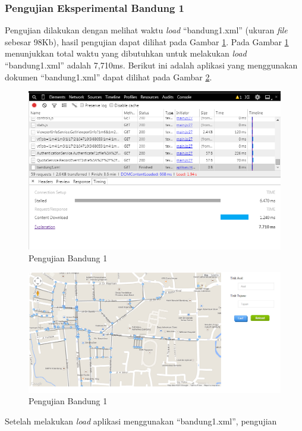 \subsubsection{Pengujian Eksperimental Bandung 1}
Pengujian dilakukan dengan melihat waktu \textit{load} ``bandung1.xml''
(ukuran \textit{file} sebesar 98Kb), hasil pengujian dapat dilihat pada Gambar
\ref{fig:pu_bandung1}.
Pada Gambar \ref{fig:pu_bandung1} menunjukkan total waktu yang dibutuhkan untuk 
melakukan \textit{load} ``bandung1.xml'' adalah 7,710ms. Berikut ini
adalah aplikasi yang menggunakan dokumen ``bandung1.xml'' dapat dilihat pada
Gambar \ref{fig:bandung1_load}.
\begin{figure}[h]
\centering
\includegraphics[scale=0.75]{Gambar/pu_bandung1}
\caption[Pengujian Bandung 1]{Pengujian Bandung 1}
\label{fig:pu_bandung1}
\end{figure}
\begin{figure}[h]
\centering
\includegraphics[scale=0.45]{Gambar/bandung1_load}
\caption[Pengujian Bandung 1]{Pengujian Bandung 1}
\label{fig:bandung1_load}
\end{figure}
\clearpage
Setelah melakukan \textit{load} aplikasi menggunakan ``bandung1.xml'', pengujian
